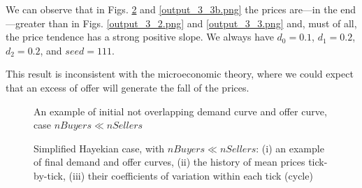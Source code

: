 \documentclass[10pt]{report}
\begin{document}
\begin{appendices}
We can observe that in Figs. \ref{output_3_2b.png} and \ref{output_3_3b.png} the prices are---in the end---greater than in Figs. \ref{output_3_2.png} and \ref{output_3_3.png} and, must of all, the price tendence has a strong positive slope. We always have $d_0=0.1$, $d_1=0.2$,  $d_2=0.2$, and $seed=111$.

This result is inconsistent with the microeconomic theory, where we could expect that an excess of offer will generate the fall of the prices.


\begin{figure}[H]
\begin{center}
\caption{An example of initial not overlapping demand curve and offer curve, case $nBuyers \ll nSellers$}
\label{output_3_1b.png}
\end{center}
\end{figure}

\begin{figure}[H]
\begin{center}
\caption{Simplified Hayekian case, with $nBuyers \ll nSellers$: (i) an example of final demand and offer curves, (ii) the history of mean prices tick-by-tick, (iii) their coefficients of variation within each tick (cycle)}
\label{output_3_2b.png}
\end{center}
\end{figure}


\end{appendices}
\end{document}
